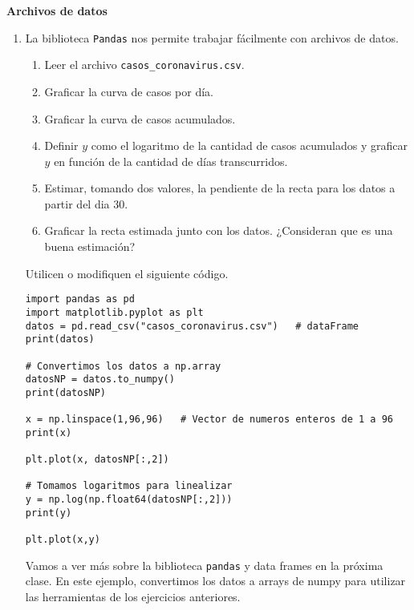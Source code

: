\documentclass[a4paper,11pt]{article}
\theoremstyle{definition}
\begin{document}
\textbf{\large Archivos de datos}

\begin{enumerate}[resume]
\item La biblioteca \lstinline{Pandas} nos permite trabajar fácilmente con archivos de datos.

\begin{enumerate}
\item Leer el archivo \lstinline{casos_coronavirus.csv}.
\item Graficar la curva de casos por día.
\item Graficar la curva de casos acumulados.
\item Definir $y$ como el logaritmo de la cantidad de casos acumulados y graficar $y$ en función de la cantidad de días transcurridos.
\item Estimar, tomando dos valores, la pendiente de la recta para los datos a partir del dia 30.
\item Graficar la recta estimada junto con los datos. ¿Consideran que es una buena estimación?
\end{enumerate}

Utilicen o modifiquen el siguiente código.

\begin{lstlisting}
import pandas as pd
import matplotlib.pyplot as plt
datos = pd.read_csv("casos_coronavirus.csv")   # dataFrame
print(datos)

# Convertimos los datos a np.array
datosNP = datos.to_numpy()
print(datosNP)

x = np.linspace(1,96,96)   # Vector de numeros enteros de 1 a 96
print(x)

plt.plot(x, datosNP[:,2])

# Tomamos logaritmos para linealizar
y = np.log(np.float64(datosNP[:,2]))
print(y)

plt.plot(x,y)
\end{lstlisting}

Vamos a ver más sobre la biblioteca \lstinline{pandas} y data frames en la próxima clase. En este ejemplo, convertimos los datos a arrays de numpy para utilizar las herramientas de los ejercicios anteriores.

\end{enumerate}
\end{document}
